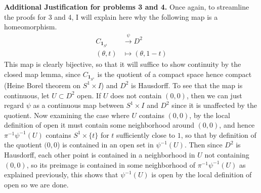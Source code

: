 \documentclass[10.5pt]{article}
\theoremstyle{definition}
\newcommand{\set}[1]{\{#1\}}
\begin{document}
    \textbf{Additional Justification for problems 3 and 4.} Once again, to streamline the proofs for 3 and 4, I will explain here why the following map is a homeomorphism.
    \begin{align*}
        C_{\mathbf{1}_{S^1}} &\overset{\psi}{\to} D^2 \\ 
        (\theta, t) &\mapsto (\theta, 1-t)
    \end{align*}
    This map is clearly bijective, so that it will suffice to show continuity by the closed map lemma, since 
    \(C_{\mathbf{1}_{S^1}}\) is the quotient of a compact space hence compact (Heine Borel theorem on \(S^1 \times I\))
    and \(D^2\) is Hausdorff. To see that the map is continuous, let \(U \subset D^2\) open.
    If \(U\) does not contain \((0,0)\), then we can just regard \(\psi\) as a continuous map between \(S^1 \times I\) and \(D^2\) since it is unaffected by the quotient. 
    Now examining the case where \(U\) contains \((0,0)\), by the local definition of open it must contain some neighborhood around \((0,0)\), and hence \(\pi^{-1}\psi^{-1}(U)\) contains
    \(S^1 \times \set{t}\) for \(t\) sufficiently close to \(1\), so that by definition of the quotient \((0,0\)) is contained in an open set in \(\psi^{-1}(U)\). Then since \(D^2\) is Hausdorff,
    each other point is contained in a neighborhood in \(U\) not containing \((0,0)\), so its preimage is contained in some neighborhood of \(\pi^{-1}\psi^{-1}(U)\) as explained previously, this shows that
    \(\psi^{-1}(U)\) is open by the local definition of open so we are done.
\end{document}
